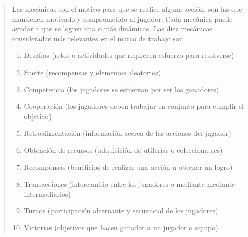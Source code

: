  \begin{quote}
    Las mecánicas son el motivo para que se realice alguna acción, son las que mantienen
    motivado y comprometido al jugador. Cada mecánica puede ayudar a que se logren una o
    más dinámicas. Las diez mecánicas consideradas más relevantes en el marco de trabajo
    son:

    \begin{enumerate}
        \item Desafíos (retos o actividades que requieren esfuerzo para resolverse)
        \item Suerte (recompensas y elementos aleatorios)
        \item Competencia (los jugadores se esfuerzan por ser los ganadores)
        \item Cooperación (los jugadores deben trabajar en conjunto para cumplir el objetivo)
        \item Retroalimentación (información acerca de las acciones del jugador)
        \item Obtención de recursos (adquisición de utilerías o coleccionables)
        \item Recompensas (beneficios de realizar una acción u obtener un logro)
        \item Transacciones (intercambio entre los jugadores o mediante mediante intermediarios)
        \item Turnos (participación alternante y secuencial de los jugadores)
        \item Victorias (objetivos que hacen ganador a un jugador o equipo)\\
    \end{enumerate}
 \end{quote}


